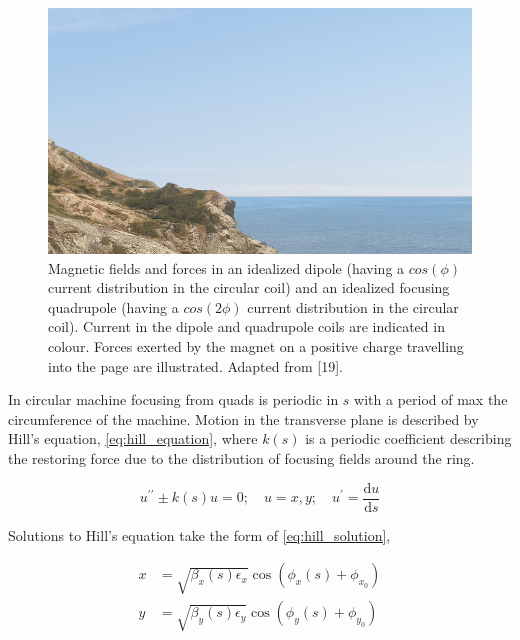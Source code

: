 \begin{figure}[!htb]
    \begin{center}
    \includegraphics[width = 0.9\linewidth]{Figures/placeholder.png}
    \caption{Magnetic fields and forces in an idealized dipole (having a $cos(\phi)$ current distribution in the circular coil) and an idealized focusing quadrupole (having a $cos(2\phi)$ current distribution in the circular coil). Current in the dipole and quadrupole coils are indicated in colour. Forces exerted by the magnet on a positive charge travelling into the page are illustrated. Adapted from [19].}
    \label{fig:dipole_quadrupole_fields}
    \end{center}
\end{figure}

In circular machine focusing from quads is periodic in $s$ with a period of max the circumference of the machine.
Motion in the transverse plane is described by Hill’s equation, \cref{eq:hill_equation}, where $k(s)$ is a periodic coefficient describing the restoring force due to the distribution of focusing fields around the ring.
\bigbreak

\begin{equation}
    u^{\prime \prime} \pm k(s) u = 0; \quad u = x, y; \quad u^{\prime} = \frac{\mathrm{d}u}{\mathrm{d}s}
    \label{eq:hill_equation}
\end{equation}
\bigbreak

Solutions to Hill’s equation take the form of \cref{eq:hill_solution},
\bigbreak

\begin{equation}
    \begin{aligned}
    x &= \sqrt{\beta_{x}(s) \epsilon_{x}} \cos \left(\phi_{x}(s) + \phi_{x_0}\right) \\
    y &= \sqrt{\beta_{y}(s) \epsilon_{y}} \cos \left(\phi_{y}(s) + \phi_{y_0}\right)
    \end{aligned}
    \label{eq:hill_solution}
\end{equation}

